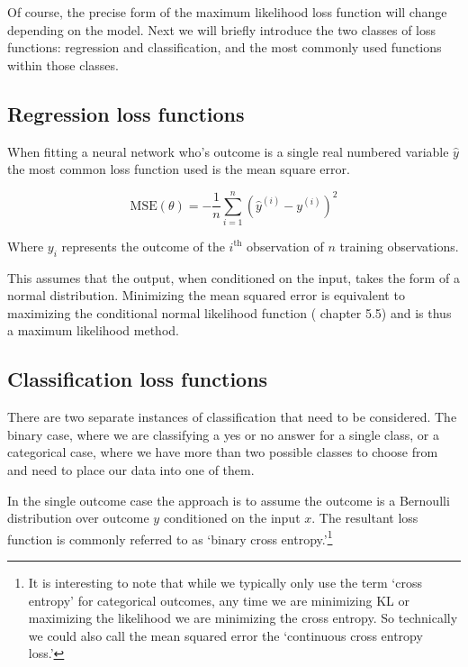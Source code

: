 \documentclass[]{book}
\let\rmarkdownfootnote\footnote%
\def\footnote{\protect\rmarkdownfootnote}
\theoremstyle{definition}
\theoremstyle{definition}
\theoremstyle{definition}
\theoremstyle{remark}
\let\BeginKnitrBlock\begin \let\EndKnitrBlock\end
\begin{document}
Of course, the precise form of the maximum likelihood loss function will
change depending on the model. Next we will briefly introduce the two
classes of loss functions: regression and classification, and the most
commonly used functions within those classes.

\subsection{Regression loss functions}\label{regression-loss-functions}

When fitting a neural network who's outcome is a single real numbered
variable \(\hat{y}\) the most common loss function used is the mean
square error.

\BeginKnitrBlock{definition}[Mean squared error loss]
\protect\hypertarget{def:mse}{}{\label{def:mse} {}
}\[\text{MSE}(\theta) = -\frac{1}{n} \sum_{i = 1}^{n} (\hat{y}^{(i)} - y^{(i)})^2\]

Where \(y_i\) represents the outcome of the \(i^{\text{th}}\)
observation of \(n\) training observations.
\EndKnitrBlock{definition}

This assumes that the output, when conditioned on the input, takes the
form of a normal distribution. Minimizing the mean squared error is
equivalent to maximizing the conditional normal likelihood function
(\citet{goodfellow_DL} chapter 5.5) and is thus a maximum likelihood
method.

\subsection{Classification loss
functions}\label{classification-loss-functions}

There are two separate instances of classification that need to be
considered. The binary case, where we are classifying a yes or no answer
for a single class, or a categorical case, where we have more than two
possible classes to choose from and need to place our data into one of
them.

In the single outcome case the approach is to assume the outcome is a
Bernoulli distribution over outcome \(y\) conditioned on the input
\(x\). The resultant loss function is commonly referred to as `binary
cross entropy.'\footnote{It is interesting to note that while we
  typically only use the term `cross entropy' for categorical outcomes,
  any time we are minimizing KL or maximizing the likelihood we are
  minimizing the cross entropy. So technically we could also call the
  mean squared error the `continuous cross entropy loss.'}
\end{document}
